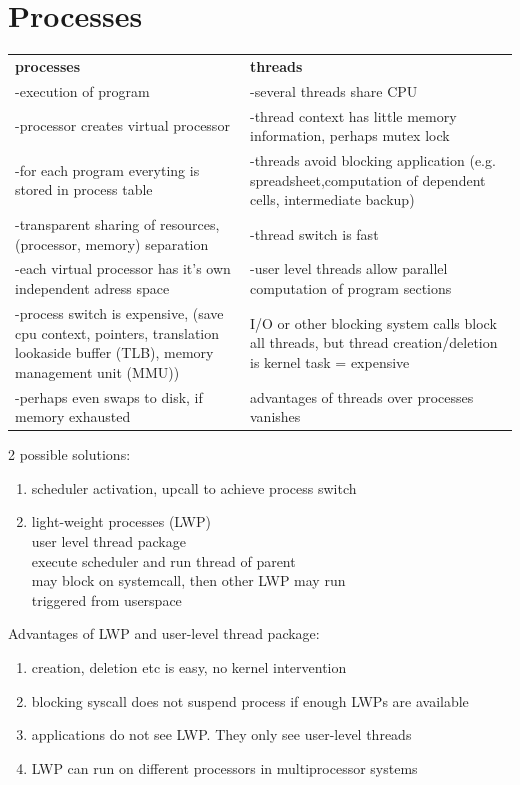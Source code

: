 \documentclass[ngerman,a4paper]{report}
\begin{document}
\section{Processes}
\begin{tabular}{p{7cm} p{7cm}}
\textbf{processes}			&\textbf{threads}\\
-execution of program			&-several threads share CPU\\
-processor creates virtual processor	&-thread context has little memory information, perhaps mutex lock\\
-for each program everyting is stored in process table	&-threads avoid blocking application (e.g. spreadsheet,computation of dependent cells, intermediate backup)\\
-transparent sharing of resources,(processor, memory) separation&-thread switch is fast\\
-each virtual processor has it's own independent adress space&-user level threads allow parallel computation of program sections\\
-process switch is expensive, (save cpu context, pointers, translation lookaside buffer (TLB), memory management unit (MMU))&I/O or other blocking system calls block all threads, but thread creation/deletion is kernel task = expensive \\
-perhaps even swaps to disk, if memory exhausted& advantages of threads over processes vanishes\\
\end{tabular}

2 possible solutions:\\
\begin{enumerate}
\item scheduler activation, upcall to achieve process switch
\item light-weight processes (LWP)\\
user level thread package\\
execute scheduler and run thread of parent\\
may block on systemcall, then other LWP may run\\
triggered from userspace\\
\end{enumerate}
Advantages of LWP and user-level thread package:\\
\begin{enumerate}
\item creation, deletion etc is easy, no kernel intervention
\item blocking syscall does not suspend process if enough LWPs are available
\item applications do not see LWP. They only see user-level threads
\item LWP can run on different processors in multiprocessor systems
\end{enumerate}
\end{document}
